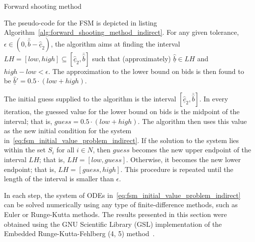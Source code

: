 \begin{algorithm}
\caption{Forward shooting method}
\label{alg:forward_shooting_method_indirect}
\begin{algorithmic}[1]
  \Statex
  \Statex
    \Let{$bids$}{$[guess, \bar{\hat{b}})$}
    \Else
    \EndIf
  \EndWhile
  \Statex
\end{algorithmic}
\end{algorithm}

The pseudo-code for the FSM is depicted in listing Algorithm~\ref{alg:forward_shooting_method_indirect}. For any given tolerance, $\epsilon\in\left(0, \bar{\hat{b}} - \underline{\hat{c}}_2\right)$, the algorithm aims at finding the interval $LH=[low, high]\subseteq [\underline{\hat{c}}_2, \bar{\hat{b}}]$ such that (approximately) $\underline{\hat{b}}\in LH$ and $high-low < \epsilon$. The approximation to the lower bound on bids is then found to be $\underline{\hat{b}}' = 0.5\cdot(low + high)$.

The initial guess supplied to the algorithm is the interval $[\underline{\hat{c}}_2, \bar{\hat{b}}]$. In every iteration, the guessed value for the lower bound on bids is the midpoint of the interval; that is, $guess = 0.5\cdot(low + high)$. The algorithm then uses this value as the new initial condition for the system in~\eqref{eq:fsm_initial_value_problem_indirect}. If the solution to the system lies within the set $S_i$ for all $i\in N$, then $guess$ becomes the new upper endpoint of the interval $LH$; that is, $LH = [low, guess]$. Otherwise, it becomes the new lower endpoint; that is, $LH = [guess, high]$. This procedure is repeated until the length of the interval is smaller than $\epsilon$.

In each step, the system of ODEs in~\eqref{eq:fsm_initial_value_problem_indirect} can be solved numerically using any type of finite-difference methods, such as Euler or Runge-Kutta methods. The results presented in this section were obtained using the GNU Scientific Library (GSL) implementation of the Embedded Runge-Kutta-Fehlberg (4, 5) method~\cite{GSL}.

